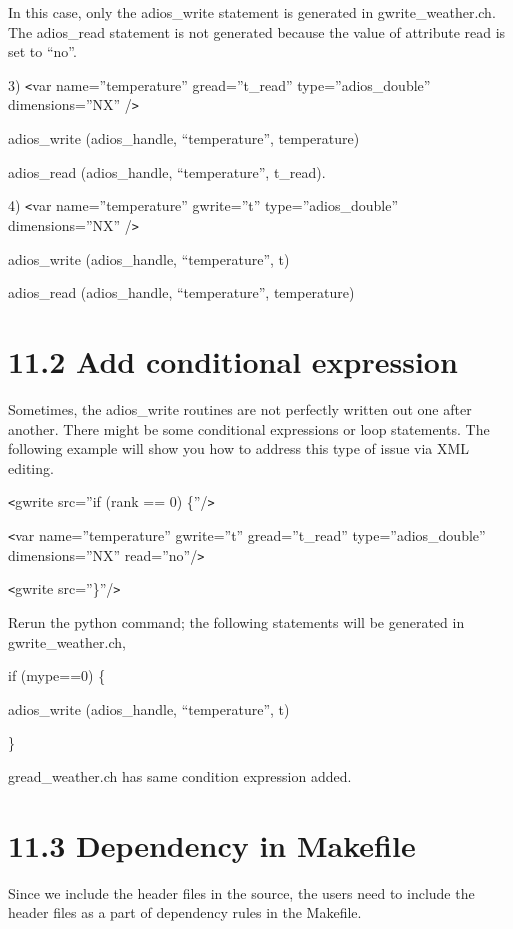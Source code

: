In this case, only the adios\_write statement is generated in gwrite\_weather.ch. 
The adios\_read statement is not generated because the value of attribute read 
is set to ``no''. 

3) \texttt{<}var name=''temperature'' gread=''t\_read'' type=''adios\_double'' 
dimensions=''NX'' /\texttt{>}

adios\_write (adios\_handle, ``temperature'', temperature)

adios\_read (adios\_handle, ``temperature'', t\_read).

4) \texttt{<}var name=''temperature'' gwrite=''t'' type=''adios\_double'' dimensions=''NX'' 
/\texttt{>}

adios\_write (adios\_handle, ``temperature'', t)

adios\_read (adios\_handle, ``temperature'', temperature)\label{HToc84890288}\label{HToc212016664}\label{HToc212016906}\label{HToc182553437}

\section*{{\large 11.2 }{\large \textbf{Add conditional expression}}}

Sometimes, the adios\_write routines are not perfectly written out one after another. 
There might be some conditional expressions or loop statements. The following example 
will show you how to address this type of issue via XML editing.

\texttt{<}gwrite src=''if (rank == 0) \{''/\texttt{>}

\leftskip=18pt
\texttt{<}var name=''temperature'' gwrite=''t'' gread=''t\_read'' type=''adios\_double'' 
dimensions=''NX'' read=''no''/\texttt{>}

\leftskip=0pt
\texttt{<}gwrite src=''\}''/\texttt{>}

Rerun the python command; the following statements will be generated in gwrite\_weather.ch,

if (mype==0) \{

adios\_write (adios\_handle, ``temperature'', t)

\}

gread\_weather.ch has same condition expression added.\label{HToc84890289}\label{HToc212016665}\label{HToc212016907}\label{HToc182553438}

\section*{{\large 11.3 }{\large \textbf{Dependency in Makefile}}}

Since we include the header files in the source, the users need to include the 
header files as a part of dependency rules in the Makefile.\label{HToc82067534}\label{HToc84890290}\label{HToc212016666}\label{HToc212016908}\label{HToc182553439}
